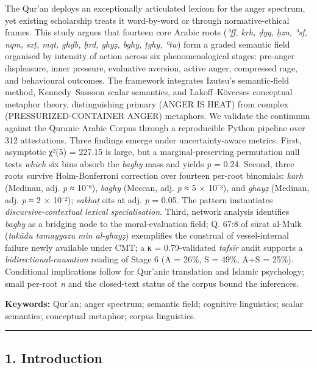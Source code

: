 \documentclass[11pt,a4paper]{article}
\begin{document}
The Qur'an deploys an exceptionally articulated lexicon for the anger
spectrum, yet existing scholarship treats it word-by-word or through
normative-ethical frames. This study argues that fourteen core Arabic
roots (\emph{ʾff, krh, ḍyq, ḥzn, ʾsf, nqm, sxṭ, mqt, ghḍb, ḥrd, ghyẓ,
bghy, ṭghy, ʿtw}) form a graded semantic field organised by intensity of
action across six phenomenological stages: pre-anger displeasure, inner
pressure, evaluative aversion, active anger, compressed rage, and
behavioural outcomes. The framework integrates Izutsu's semantic-field
method, Kennedy--Sassoon scalar semantics, and Lakoff--Kövecses
conceptual metaphor theory, distinguishing primary (ANGER IS HEAT) from
complex (PRESSURIZED-CONTAINER ANGER) metaphors. We validate the
continuum against the Quranic Arabic Corpus through a reproducible
Python pipeline over 312 attestations. Three findings emerge under
uncertainty-aware metrics. First, asymptotic χ²(5) = 227.15 is large,
but a marginal-preserving permutation null tests \emph{which} six bins
absorb the \emph{baghy} mass and yields \emph{p} = 0.24. Second, three
roots survive Holm-Bonferroni correction over fourteen per-root
binomials: \emph{karh} (Medinan, adj. \emph{p} ≈ 10⁻⁶), \emph{baghy}
(Meccan, adj. \emph{p} ≈ 5 × 10⁻³), and \emph{ghayẓ} (Medinan, adj.
\emph{p} ≈ 2 × 10⁻²); \emph{sakhaṭ} sits at adj. \emph{p} = 0.05. The
pattern instantiates \emph{discursive-contextual lexical
specialisation}. Third, network analysis identifies \emph{baghy} as a
bridging node to the moral-evaluation field; Q. 67:8 of sūrat al-Mulk
(\emph{takādu tamayyazu min al-ghayẓ}) exemplifies the construal of
vessel-internal failure newly available under CMT; a κ = 0.79-validated
\emph{tafsīr} audit supports a \emph{bidirectional-causation} reading of
Stage 6 (A = 26\%, S = 49\%, A+S = 25\%). Conditional implications
follow for Qur'anic translation and Islamic psychology; small per-root
\emph{n} and the closed-text status of the corpus bound the inferences.

\textbf{Keywords:} Qur'an; anger spectrum; semantic field; cognitive
linguistics; scalar semantics; conceptual metaphor; corpus linguistics.

\begin{center}\rule{0.5\linewidth}{0.5pt}\end{center}

\subsection{1. Introduction}\label{introduction}
\end{document}
